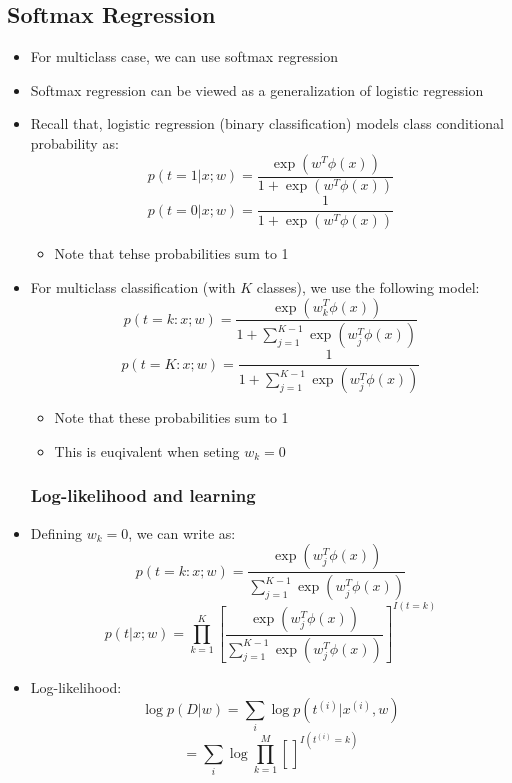 \subsection{Softmax Regression}
\begin{itemize}
	\item For multiclass case, we can use softmax regression
	\item Softmax regression can be viewed as a generalization of logistic regression
	\item Recall that, logistic regression (binary classification) models class conditional probability as:
		$$p(t=1|x;w)=\frac{\exp(w^T \phi(x))}{1+\exp(w^T\phi(x))}$$
		$$p(t=0|x;w)=\frac{1}{1+\exp(w^T\phi(x))}$$
	\begin{itemize}
		\item Note that tehse probabilities sum to 1
	\end{itemize}
	\item For multiclass classification (with $K$ classes), we use the following model:
		$$p(t=k:x;w)=\frac{\exp(w_k^T \phi(x))}{1+\sum_{j=1}^{K-1}\exp(w^T_j \phi(x))}$$
		$$p(t=K:x;w)=\frac{1}{1+\sum_{j=1}^{K-1}\exp(w^T_j \phi(x))}$$
	\begin{itemize}
		\item Note that these probabilities sum to 1
		\item This is euqivalent when seting $w_k=0$
	\end{itemize}
	\subsubsection{Log-likelihood and learning}
	\item Defining $w_k=0$, we can write as:
		$$p(t=k:x;w)=\frac{\exp(w^T_j \phi(x))}{\sum_{j=1}^{K-1}\exp(w^T_j \phi(x))}$$
		$$p(t|x;w)=\prod_{k=1}^K \left[ \frac{\exp(w^T_j \phi(x))}{\sum_{j=1}^{K-1}\exp(w^T_j \phi(x))}\right]^{I(t=k)}$$
	\item Log-likelihood:
		$$\log p(D|w)=\sum_{i}\log p(t^{(i)}|x^{(i)}, w)$$
		$$=\sum_{i}\log\prod_{k=1}^M \left[ \frac{}{} \right]^{I(t^{(i)}=k)}$$
\end{itemize}

